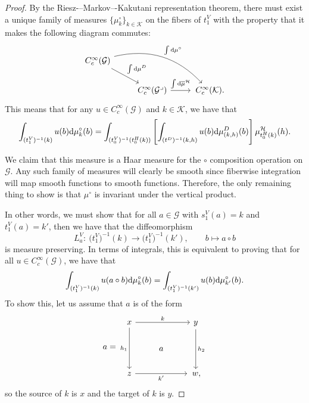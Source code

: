 \documentclass[10pt,a4paper]{amsart}
\numberwithin{equation}{section}
\theoremstyle{definition}
\newcommand{\CG}{\mathcal{G}}
\newcommand{\CH}{\mathcal{H}}
\newcommand{\CK}{\mathcal{K}}
\newcommand{\inv}{^{-1}}
\begin{document}
  \begin{proof}
       By the Riesz-–Markov–-Kakutani representation theorem, there must exist a unique family of measures $ \{ \mu_k^\circ \}_{k \in \CK} $ on the fibers of $ t^V_1 $ with the property that it makes the following diagram commutes:
    \[
    \begin{tikzcd}
         C^\infty_c(\CG) \arrow[rrd, bend left, "\int {\rm d} \mu^\circ"] \arrow[dr, "\int {\rm d} \mu^D"] & & \\
      & C^\infty_c(\CG^\lrcorner)  \arrow[r, "\int {\rm d}\overline{\mu}^\CH"] &\, C^\infty_c(\CK).
    \end{tikzcd}
    \]
    This means that for any $ u \in C^\infty_c(\CG) $ and $ k \in \CK $, we have that
    \[
    \int_{(t^V_1)\inv(k)} u(b) {\rm d} \mu^\circ_{k}(b) =
    \int_{(t^V_0) \inv(t^H_0(k))} \left[\int_{(t^D)\inv(k,h)} u(b) {\rm d} \mu^D_{(k,h)}(b) \right] \mu^\CH_{t^H_0(k)} (h).
    \]

       We claim that this measure is a Haar measure for the $ \circ $ composition operation on $ \CG $. Any such family of measures will clearly be smooth since fiberwise integration will map smooth functions to smooth functions.
    Therefore, the only remaining thing to show is that $ \mu^\circ $ is invariant under the vertical product.

    In other words, we must show that for all $ a \in \CG $ with $ s^V_1(a) = k $ and $ t^V_1(a) = k' $, then we have that the diffeomorphism
    \[ L^V_a \colon\ \big(t^V_1\big)\inv(k) \to \big(t^V_1\big)\inv(k'), \qquad b \mapsto a \circ b \]
    is measure preserving.
    In terms of integrals, this is equivalent to proving that for all $ u \in C^\infty_c(\CG) $, we have that
    \[
     \int_{(t^V_1)\inv(k)} u(a \circ b) {\rm d} \mu_k^\circ(b) = \int_{(t^V_1)\inv(k')} u( b) {\rm d} \mu_{k'}^\circ (b).
    \]
    To show this, let us assume that $ a $ is of the form
\[
a = \begin{tikzcd}
   x \arrow[rr, "k"] \arrow[dd, "h_1", swap] & & y \arrow[dd, "h_2"] \\
   & a & \\
   z\arrow[rr, "k'", swap] & & \,w,
\end{tikzcd}
\]
so the source of $ k $ is $ x $ and the target of $ k $ is $ y $.


\end{proof}
\end{document}
